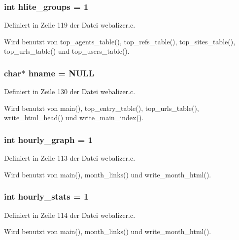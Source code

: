\subsubsection{\setlength{\rightskip}{0pt plus 5cm}int {\bf hlite\_\-groups} = 1}\label{webalizer_8c_607dff280556363fab771e9e492ea057}




Definiert in Zeile 119 der Datei webalizer.c.

Wird benutzt von top\_\-agents\_\-table(), top\_\-refs\_\-table(), top\_\-sites\_\-table(), top\_\-urls\_\-table() und top\_\-users\_\-table().
\subsubsection{\setlength{\rightskip}{0pt plus 5cm}char$\ast$ {\bf hname} = NULL}\label{webalizer_8c_674a1f0ec86ffb26578c11999c89a3c0}




Definiert in Zeile 130 der Datei webalizer.c.

Wird benutzt von main(), top\_\-entry\_\-table(), top\_\-urls\_\-table(), write\_\-html\_\-head() und write\_\-main\_\-index().
\subsubsection{\setlength{\rightskip}{0pt plus 5cm}int {\bf hourly\_\-graph} = 1}\label{webalizer_8c_ef88d69bc7f6d6214835f0f15ef4522a}




Definiert in Zeile 113 der Datei webalizer.c.

Wird benutzt von main(), month\_\-links() und write\_\-month\_\-html().
\subsubsection{\setlength{\rightskip}{0pt plus 5cm}int {\bf hourly\_\-stats} = 1}\label{webalizer_8c_6359837576bb8bf34e8b6984cee1e53a}




Definiert in Zeile 114 der Datei webalizer.c.

Wird benutzt von main(), month\_\-links() und write\_\-month\_\-html().
